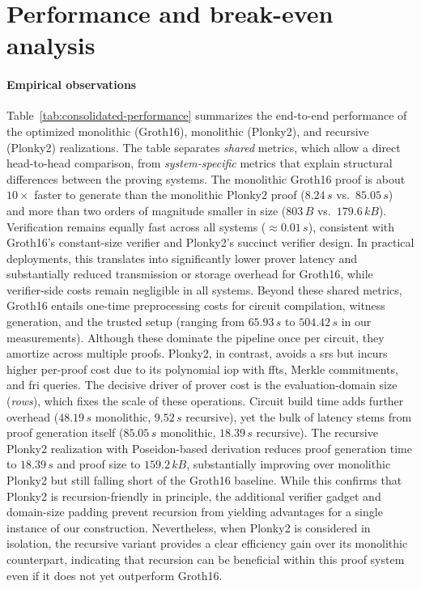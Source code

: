 \section{Performance and break-even analysis}
\label{sec:analysis}

\paragraph{Empirical observations}
Table~\ref{tab:consolidated-performance} summarizes the end-to-end performance of the optimized monolithic (Groth16), monolithic (Plonky2), and recursive (Plonky2) realizations. The table separates \emph{shared} metrics, which allow a direct head-to-head comparison, from \emph{system-specific} metrics that explain structural differences between the proving systems. The monolithic Groth16 proof is about $10\times$ faster to generate than the monolithic Plonky2 proof ($8.24\,s$ vs.\ $85.05\,s$) and more than two orders of magnitude smaller in size ($803\,B$ vs.\ $179.6\,kB$). Verification remains equally fast across all systems ($\approx 0.01\,s$), consistent with Groth16’s constant-size verifier and Plonky2’s succinct verifier design. In practical deployments, this translates into significantly lower prover latency and substantially reduced transmission or storage overhead for Groth16, while verifier-side costs remain negligible in all systems. Beyond these shared metrics, Groth16 entails one-time preprocessing costs for circuit compilation, witness generation, and the trusted setup (ranging from $65.93\,s$ to $504.42\,s$ in our measurements). Although these dominate the pipeline once per circuit, they amortize across multiple proofs. Plonky2, in contrast, avoids a \acrshort{srs} but incurs higher per-proof cost due to its polynomial \acrshort{iop} with \acrshort{fft}s, Merkle commitments, and \acrshort{fri} queries. The decisive driver of prover cost is the evaluation-domain size (\emph{rows}), which fixes the scale of these operations. Circuit build time adds further overhead ($48.19\,s$ monolithic, $9.52\,s$ recursive), yet the bulk of latency stems from proof generation itself ($85.05\,s$ monolithic, $18.39\,s$ recursive). The recursive Plonky2 realization with Poseidon-based derivation reduces proof generation time to $18.39\,s$ and proof size to $159.2\,kB$, substantially improving over monolithic Plonky2 but still falling short of the Groth16 baseline. While this confirms that Plonky2 is recursion-friendly in principle, the additional verifier gadget and domain-size padding prevent recursion from yielding advantages for a single instance of our construction. Nevertheless, when Plonky2 is considered in isolation, the recursive variant provides a clear efficiency gain over its monolithic counterpart, indicating that recursion can be beneficial within this proof system even if it does not yet outperform Groth16.

